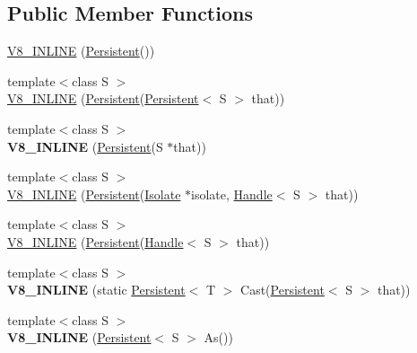 \subsection*{Public Member Functions}
\begin{DoxyCompactItemize}
\item 
\hyperlink{classv8_1_1_persistent_ad523a6fc8bf2490020009436519423d0}{V8\+\_\+\+I\+N\+L\+I\+N\+E} (\hyperlink{classv8_1_1_persistent}{Persistent}())
\item 
{\footnotesize template$<$class S $>$ }\\\hyperlink{classv8_1_1_persistent_a22ac4d575e808ed10b6504dc8f812789}{V8\+\_\+\+I\+N\+L\+I\+N\+E} (\hyperlink{classv8_1_1_persistent}{Persistent}(\hyperlink{classv8_1_1_persistent}{Persistent}$<$ S $>$ that))
\item 
\hypertarget{classv8_1_1_persistent_a59285008a6fcdd9a5189015403375b4e}{}{\footnotesize template$<$class S $>$ }\\{\bfseries V8\+\_\+\+I\+N\+L\+I\+N\+E} (\hyperlink{classv8_1_1_persistent}{Persistent}(S $\ast$that))\label{classv8_1_1_persistent_a59285008a6fcdd9a5189015403375b4e}

\item 
{\footnotesize template$<$class S $>$ }\\\hyperlink{classv8_1_1_persistent_a7ca3b3808718378ee842528d5967cb07}{V8\+\_\+\+I\+N\+L\+I\+N\+E} (\hyperlink{classv8_1_1_persistent}{Persistent}(\hyperlink{classv8_1_1_isolate}{Isolate} $\ast$isolate, \hyperlink{classv8_1_1_handle}{Handle}$<$ S $>$ that))
\item 
{\footnotesize template$<$class S $>$ }\\\hyperlink{classv8_1_1_persistent_aabe20913d6860e124574bc4d67535a5c}{V8\+\_\+\+I\+N\+L\+I\+N\+E} (\hyperlink{classv8_1_1_persistent}{Persistent}(\hyperlink{classv8_1_1_handle}{Handle}$<$ S $>$ that))
\item 
\hypertarget{classv8_1_1_persistent_acd5e8f1e94848aff791b9bdf0f1fed90}{}{\footnotesize template$<$class S $>$ }\\{\bfseries V8\+\_\+\+I\+N\+L\+I\+N\+E} (static \hyperlink{classv8_1_1_persistent}{Persistent}$<$ T $>$ Cast(\hyperlink{classv8_1_1_persistent}{Persistent}$<$ S $>$ that))\label{classv8_1_1_persistent_acd5e8f1e94848aff791b9bdf0f1fed90}

\item 
\hypertarget{classv8_1_1_persistent_a092bc149b5515c88e5950717e90eed9f}{}{\footnotesize template$<$class S $>$ }\\{\bfseries V8\+\_\+\+I\+N\+L\+I\+N\+E} (\hyperlink{classv8_1_1_persistent}{Persistent}$<$ S $>$ As())\label{classv8_1_1_persistent_a092bc149b5515c88e5950717e90eed9f}


\end{DoxyCompactItemize}
